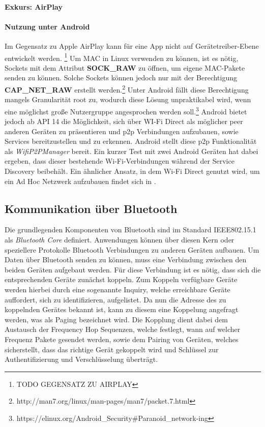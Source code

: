         \paragraph{Exkurs: AirPlay}

    
        \paragraph{Nutzung unter Android}
        Im Gegensatz zu Apple AirPlay kann für eine App nicht auf Gerätetreiber-Ebene entwickelt werden.  \footnote{TODO GEGENSATZ ZU AIRPLAY} 
        Um MAC in Linux verwenden zu können, ist es nötig, Sockets mit dem Attribut {\bf SOCK\_RAW} zu öffnen,
        um eigene MAC-Pakete senden zu können. Solche Sockets können jedoch nur mit der Berechtigung {\bf CAP\_NET\_RAW} erstellt werden.\footnote{http://man7.org/linux/man-pages/man7/packet.7.html}
        Unter Android fällt diese Berechtigung mangels Granularität root zu, wodurch diese Lösung unpraktikabel wird,
        wenn eine möglichst große Nutzergruppe angesprochen werden soll.\footnote{https://elinux.org/Android\_Security\#Paranoid\_network-ing}
        Android bietet jedoch ab API 14 die Möglichkeit, sich über WI-Fi Direct als möglicher peer anderen Geräten zu präsentieren und
        p2p Verbindungen aufzubauen, sowie Services bereitzustellen und zu erkennen.
        Android stellt diese p2p Funktionalität als {\it WifiP2PManager} bereit. Ein kurzer Test mit zwei Android Geräten hat dabei ergeben,
        dass dieser bestehende Wi-Fi-Verbindungen während der Service Discovery beibehält.\cite{test-repository}
        Ein ähnlicher Ansatz, in dem Wi-Fi Direct genutzt wird, um ein Ad Hoc Netzwerk aufzubauen findet sich in \cite{Aneja}.

    \subsection{Kommunikation über Bluetooth}
        Die grundlegenden Komponenten von Bluetooth sind im Standard IEEE802.15.1 als {\it Bluetooth Core} definiert. Anwendungen können über diesen Kern oder speziellere Protokolle Bluetooth
        Verbindungen zu anderen Geräten aufbauen.\cite[S.228]{Lueders}
        Um Daten über Bluetooth senden zu können, muss eine Verbindung zwischen den beiden Geräten aufgebaut werden. Für diese Verbindung ist es nötig,
        dass sich die entsprechenden Geräte zunächst koppeln. Zum Koppeln verfügbare Geräte werden hierbei durch eine sogenannte Inquiry, welche erreichbare Geräte auffordert,
        sich zu identifizieren, aufgelistet. Da nun die Adresse des zu koppelnden Gerätes bekannt ist, kann zu diesem eine Koppelung angefragt werden, was als Paging bezeichnet wird.
        Die Kopplung dient dabei dem Austausch der Frequency Hop Sequenzen, welche festlegt, wann auf welcher Frequenz Pakete gesendet werden, sowie dem Pairing von Geräten, welches sicherstellt,
        dass das richtige Gerät gekoppelt wird und Schlüssel zur Authentifizierung und Verschlüsselung überträgt.\cite[S.402f.]{Sauter}

